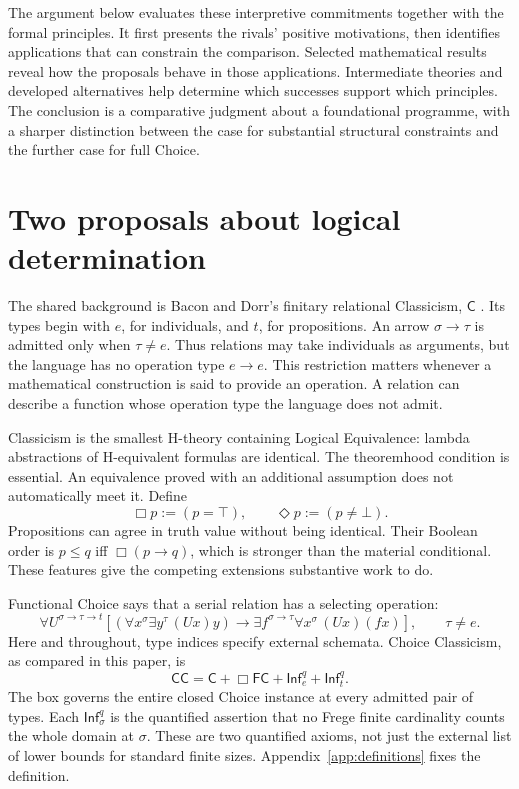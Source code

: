 \documentclass[11pt]{article}
\newcommand{\C}{\mathsf C}
\newcommand{\CC}{\mathsf{CC}}
\newcommand{\FC}{\mathsf{FC}}
\newcommand{\Infq}{\mathsf{Inf}^{q}}
\begin{document}
The argument below evaluates these interpretive commitments together with the formal principles. It first presents the rivals' positive motivations, then identifies applications that can constrain the comparison. Selected mathematical results reveal how the proposals behave in those applications. Intermediate theories and developed alternatives help determine which successes support which principles. The conclusion is a comparative judgment about a foundational programme, with a sharper distinction between the case for substantial structural constraints and the further case for full Choice.

\section{Two proposals about logical determination}\label{sec:theories}

The shared background is Bacon and Dorr's finitary relational Classicism, $\C$ \citep[\S\S1.1,1.3]{bacondorr}. Its types begin with $e$, for individuals, and $t$, for propositions. An arrow $\sigma\to\tau$ is admitted only when $\tau\ne e$. Thus relations may take individuals as arguments, but the language has no operation type $e\to e$. This restriction matters whenever a mathematical construction is said to provide an operation. A relation can describe a function whose operation type the language does not admit.

Classicism is the smallest H-theory containing Logical Equivalence: lambda abstractions of H-equivalent formulas are identical. The theoremhood condition is essential. An equivalence proved with an additional assumption does not automatically meet it. Define
\[
 \Box p:=(p=\top),\qquad \Diamond p:=(p\ne\bot).
\]
Propositions can agree in truth value without being identical. Their Boolean order is $p\le q$ iff $\Box(p\to q)$, which is stronger than the material conditional. These features give the competing extensions substantive work to do.

Functional Choice says that a serial relation has a selecting operation:
\[
 \forall U^{\sigma\to\tau\to t}
 \left[(\forall x^\sigma\exists y^\tau\,(Ux)y)
 \to\exists f^{\sigma\to\tau}\forall x^\sigma\,(Ux)(fx)\right],
 \qquad \tau\ne e.
\]
Here and throughout, type indices specify external schemata. Choice Classicism, as compared in this paper, is
\[
 \CC=\C+\Box\FC+\Infq_e+\Infq_t.
\]
The box governs the entire closed Choice instance at every admitted pair of types. Each $\Infq_\sigma$ is the quantified assertion that no Frege finite cardinality counts the whole domain at $\sigma$. These are two quantified axioms, not just the external list of lower bounds for standard finite sizes. Appendix~\ref{app:definitions} fixes the definition.
\end{document}
